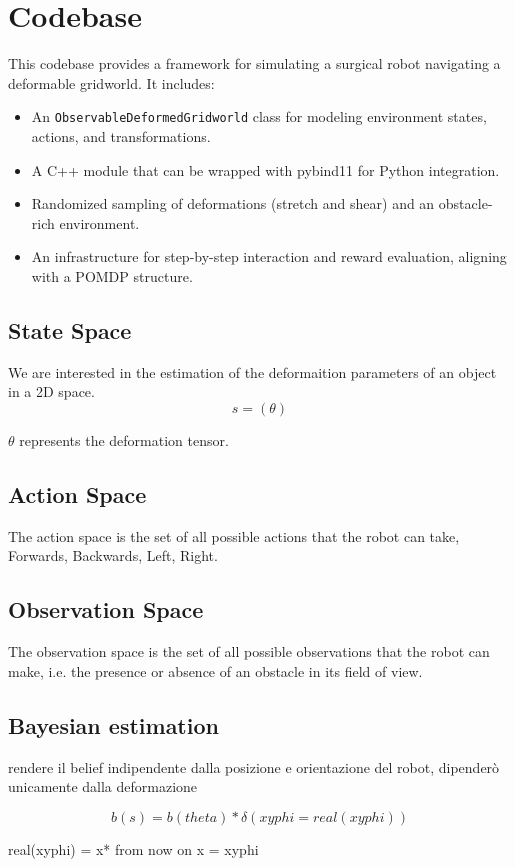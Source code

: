 \documentclass[12pt,a4paper]{article}
\begin{document}
\newpage
\section{Codebase}
This codebase provides a framework for simulating a surgical robot navigating a deformable gridworld. It includes:
\begin{itemize}
    \item An \texttt{ObservableDeformedGridworld} class for modeling environment states, actions, and transformations.
    \item A C++ module that can be wrapped with pybind11 for Python integration.
    \item Randomized sampling of deformations (stretch and shear) and an obstacle-rich environment.
    \item An infrastructure for step-by-step interaction and reward evaluation, aligning with a POMDP structure.
\end{itemize}
\subsection{State Space}
We are interested in the estimation of the deformaition parameters of an object in a 2D space.
$$s = (\theta)$$

$\theta$ represents the deformation tensor.

\subsection{Action Space}
The action space is the set of all possible actions that the robot can take, 
Forwards, Backwards, Left, Right.
\subsection{Observation Space}
The observation space is the set of all possible observations that the robot can make,
i.e. the presence or absence of an obstacle in its field of view.
\subsection{Bayesian estimation}

rendere il belief indipendente dalla posizione e orientazione del robot, dipenderò unicamente dalla deformazione

$$b(s) = b(theta) * \delta(xyphi = real(xyphi))$$

real(xyphi) = x*
from now on x = xyphi
\end{document}

